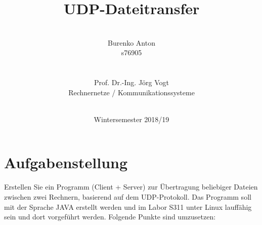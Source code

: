 \documentclass[12pt]{article}
\author{\\ Burenko Anton \\ s76905 \\ \\ \\ Prof. Dr.-Ing. Jörg Vogt \\ 
Rechnernetze / Kommunikationssysteme \\ \\
}
\date{Wintersemester 2018/19}
\title{UDP-Dateitransfer}
\begin{document}

\maketitle

\pagebreak

\tableofcontents

\pagebreak

\section{Aufgabenstellung}
Erstellen Sie ein Programm (Client + Server) zur Übertragung beliebiger Dateien zwischen zwei Rechnern, basierend auf dem UDP-Protokoll. Das Programm soll mit der Sprache JAVA erstellt werden und im Labor S311 unter Linux lauffähig sein und dort vorgeführt werden. Folgende Punkte sind umzusetzen:
\end{document}
